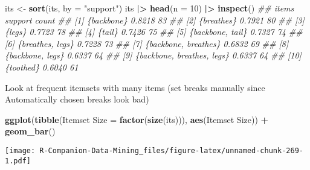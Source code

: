 \documentclass[
  notitlepage]{book}
\newenvironment{Shaded}{\begin{snugshade}}{\end{snugshade}}
\newcommand{\CommentTok}[1]{\textcolor[rgb]{0.56,0.35,0.01}{\textit{#1}}}
\newcommand{\DataTypeTok}[1]{\textcolor[rgb]{0.13,0.29,0.53}{#1}}
\newcommand{\DecValTok}[1]{\textcolor[rgb]{0.00,0.00,0.81}{#1}}
\newcommand{\ErrorTok}[1]{\textcolor[rgb]{0.64,0.00,0.00}{\textbf{#1}}}
\newcommand{\KeywordTok}[1]{\textcolor[rgb]{0.13,0.29,0.53}{\textbf{#1}}}
\newcommand{\NormalTok}[1]{#1}
\newcommand{\OperatorTok}[1]{\textcolor[rgb]{0.81,0.36,0.00}{\textbf{#1}}}
\newcommand{\StringTok}[1]{\textcolor[rgb]{0.31,0.60,0.02}{#1}}
\begin{document}
\begin{Shaded}
\begin{Highlighting}[]
\NormalTok{its \textless{}{-}}\StringTok{ }\KeywordTok{sort}\NormalTok{(its, }\DataTypeTok{by =} \StringTok{"support"}\NormalTok{)}
\NormalTok{its }\OperatorTok{|}\ErrorTok{\textgreater{}}\StringTok{ }\KeywordTok{head}\NormalTok{(}\DataTypeTok{n =} \DecValTok{10}\NormalTok{) }\OperatorTok{|}\ErrorTok{\textgreater{}}\StringTok{ }\KeywordTok{inspect}\NormalTok{()}
\CommentTok{\#\#      items                      support count}
\CommentTok{\#\# [1]  \{backbone\}                 0.8218  83   }
\CommentTok{\#\# [2]  \{breathes\}                 0.7921  80   }
\CommentTok{\#\# [3]  \{legs\}                     0.7723  78   }
\CommentTok{\#\# [4]  \{tail\}                     0.7426  75   }
\CommentTok{\#\# [5]  \{backbone, tail\}           0.7327  74   }
\CommentTok{\#\# [6]  \{breathes, legs\}           0.7228  73   }
\CommentTok{\#\# [7]  \{backbone, breathes\}       0.6832  69   }
\CommentTok{\#\# [8]  \{backbone, legs\}           0.6337  64   }
\CommentTok{\#\# [9]  \{backbone, breathes, legs\} 0.6337  64   }
\CommentTok{\#\# [10] \{toothed\}                  0.6040  61}
\end{Highlighting}
\end{Shaded}

Look at frequent itemsets with many items (set breaks manually since
Automatically chosen breaks look bad)

\begin{Shaded}
\begin{Highlighting}[]
\KeywordTok{ggplot}\NormalTok{(}\KeywordTok{tibble}\NormalTok{(}\StringTok{\textasciigrave{}}\DataTypeTok{Itemset Size}\StringTok{\textasciigrave{}}\NormalTok{ =}\StringTok{ }\KeywordTok{factor}\NormalTok{(}\KeywordTok{size}\NormalTok{(its))), }
       \KeywordTok{aes}\NormalTok{(}\StringTok{\textasciigrave{}}\DataTypeTok{Itemset Size}\StringTok{\textasciigrave{}}\NormalTok{)) }\OperatorTok{+}\StringTok{ }
\StringTok{  }\KeywordTok{geom\_bar}\NormalTok{()}
\end{Highlighting}
\end{Shaded}

\texttt{[image: R-Companion-Data-Mining\_files/figure-latex/unnamed-chunk-269-1.pdf]}
\end{document}
